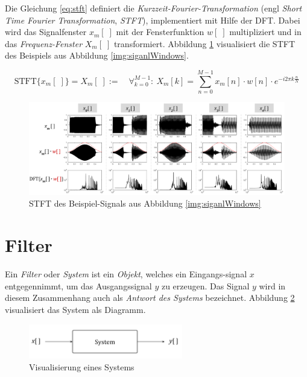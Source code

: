 Die Gleichung \ref{eq:stft} definiert die \emph{Kurzzeit-Fourier-Transformation} (engl \emph{Short Time Fourier Transformation}, \emph{STFT}), implementiert mit Hilfe der DFT. Dabei wird das Signalfenster $x_m[\;]$ mit der Fensterfunktion $w[\;]$ multipliziert und in das \emph{Frequenz-Fenster} $X_m[\;]$ transformiert.\cite{stft} Abbildung \ref{img:stft02} visualisiert die STFT des Beispiels aus Abbildung \ref{img:siganlWindows}.

 \begin{equation}
\text{STFT}\{x_m[\;]\} = X_m[\;] := \quad \mathop{\forall}_{k = 0}^{M-1} :\ X_m[k] = \sum_{n=0}^{M-1} x_m[n] \cdot w[n] \cdot e^{-i 2\pi k \frac{n}{N}}
\label{eq:stft}
\end{equation}

 \begin{figure}[h]
	\centering
	\includegraphics[width=1\textwidth]{bilder/stft03.png}
	\caption{STFT des Beispiel-Signals aus Abbildung \ref{img:siganlWindows}}
	\label{img:stft02}
\end{figure}


\section{Filter}
\label{sec:filter}

Ein \emph{Filter} oder \emph{System} ist ein \emph{Objekt}, welches ein Eingangs-signal $x$ entgegennimmt, um das Ausgangssignal $y$ zu erzeugen. Das Signal $y$ wird in diesem Zusammenhang auch als \emph{Antwort des Systems} bezeichnet. Abbildung \ref{img:system} visualisiert das System als Diagramm.\cite[]{dspMichiganSystems}

\begin{figure}[h]
	\centering
	\includegraphics[width=0.6\textwidth]{bilder/system03.png}
	\caption{Visualisierung eines Systems}
	\label{img:system}
\end{figure}

